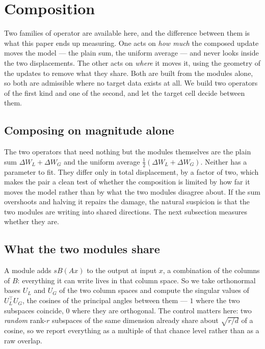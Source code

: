 \documentclass[10pt,twocolumn,a4paper]{article}
\begin{document}
\section{Composition}
\label{sec:comp}

Two families of operator are available here, and the difference between them is
what this paper ends up measuring. One acts on \emph{how much} the composed
update moves the model --- the plain sum, the uniform average --- and never
looks inside the two displacements. The other acts on \emph{where} it moves it,
using the geometry of the updates to remove what they share. Both are built from
the modules alone, so both are admissible where no target data exists at all. We
build two operators of the first kind and one of the second, and let the target
cell decide between them.

\subsection{Composing on magnitude alone}

The two operators that need nothing but the modules themselves are the plain sum
$\Delta W_L + \Delta W_G$ and the uniform average $\frac12(\Delta W_L + \Delta
W_G)$. Neither has a parameter to fit. They differ only in total displacement,
by a factor of two, which makes the pair a clean test of whether the composition
is limited by how far it moves the model rather than by what the two modules
disagree about.
If the sum overshoots and halving it repairs the damage, the natural suspicion
is that the two modules are writing into shared directions. The next subsection
measures whether they are.

\subsection{What the two modules share}

A module adds $sB(Ax)$ to the output at input $x$, a combination of the columns
of $B$: everything it can write lives in that column space. So we take
orthonormal bases $U_L$ and $U_G$ of the two column spaces and compute the
singular values of $U_L^{\top}U_G$, the cosines of the principal angles between
them --- $1$ where the two subspaces coincide, $0$ where they are orthogonal. The control matters here: two \emph{random} rank-$r$ subspaces of the same
dimension already share about $\sqrt{r/d}$ of a cosine, so we report everything
as a multiple of that chance level rather than as a raw overlap.
\end{document}
